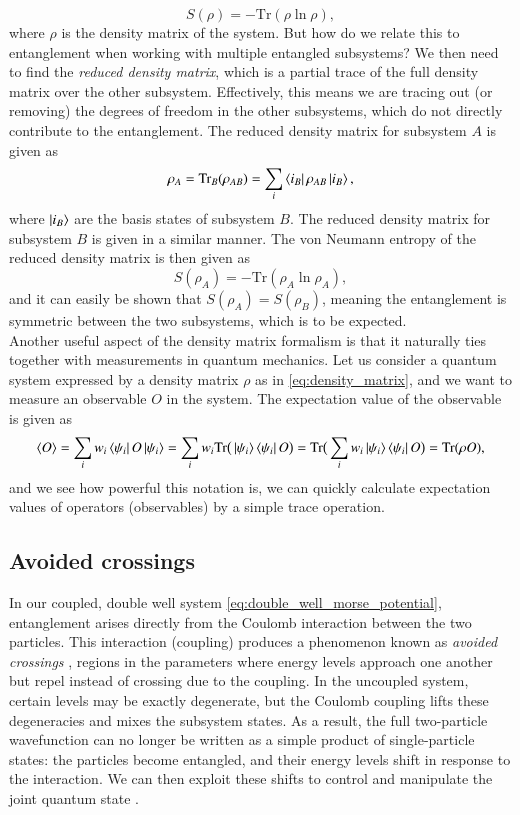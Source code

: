 \documentclass{subfiles}
\begin{document}
\begin{equation}
    S(\rho) = -\text{Tr}(\rho \ln \rho),
\end{equation}
where $\rho$ is the density matrix of the system. But how do we relate this to entanglement when working with multiple entangled subsystems? We then need to find the \emph{reduced density matrix}, which is a partial trace of the full density matrix over the other subsystem. Effectively, this means we are tracing out (or removing) the degrees of freedom in the other subsystems, which do not directly contribute to the entanglement. The reduced density matrix for subsystem $A$ is given as
\begin{equation}
    \rho_A = \text{Tr}_B(\rho_{AB}) = \sum_{i}\bra{i_B}\rho_{AB}\ket{i_B},
\end{equation}
where $\ket{i_B}$ are the basis states of subsystem $B$. The reduced density matrix for subsystem $B$ is given in a similar manner. The von Neumann entropy of the reduced density matrix is then given as
\begin{equation}
    S(\rho_A) = -\text{Tr}(\rho_A \ln \rho_A),
\end{equation}
and it can easily be shown that $S(\rho_A) = S(\rho_B)$, meaning the entanglement is symmetric between the two subsystems, which is to be expected. 
\\

Another useful aspect of the density matrix formalism is that it naturally ties together with measurements in quantum mechanics. Let us consider a quantum system expressed by a density matrix $\rho$ as in \eqref{eq:density_matrix}, and we want to measure an observable $O$ in the system. The expectation value of the observable is given as
\begin{align*}
    \braket{O} = \sum_i w_i\bra{\psi_i}O\ket{\psi_i} = \sum_i w_i\text{Tr}\big(\ket{\psi_i}\bra{\psi_i}O\big) = \text{Tr}\big(\sum_i w_i \ket{\psi_i}\bra{\psi_i}O\big) = \text{Tr}(\rho O),
\end{align*}
and we see how powerful this notation is, we can quickly calculate expectation values of operators (observables) by a simple trace operation.
\subsection{Avoided crossings}\label{sec:avoided_crossings}
In our coupled, double well system \eqref{eq:double_well_morse_potential}, entanglement arises directly from the Coulomb interaction between the two particles. This interaction (coupling) produces a phenomenon known as \emph{avoided crossings} \cite{nazir2005anticrossings}, regions in the parameters where energy levels approach one another but repel instead of crossing due to the coupling. In the uncoupled system, certain levels may be exactly degenerate, but the Coulomb coupling lifts these degeneracies and mixes the subsystem states. As a result, the full two-particle wavefunction can no longer be written as a simple product of single-particle states: the particles become entangled, and their energy levels shift in response to the interaction. We can then exploit these shifts to control and manipulate the joint quantum state \cite{petta2005coherent}.\\ 
\end{document}

